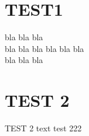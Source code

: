 \documentclass[a4paper, 12pt]{article}
\begin{document}
\selectfont
\tableofcontents


\section{TEST1}
bla bla bla \\ 
bla bla bla bla bla bla \\ 
bla bla bla 

\newpage
\section{TEST 2}

TEST 2 text test 222
\end{document}
